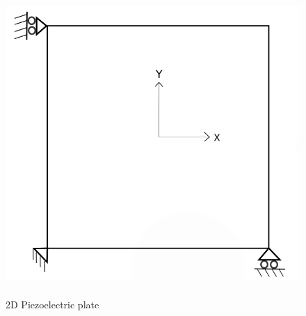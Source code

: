 \documentclass[12pt]{article}
\begin{document}
\begin{figure}[H]
	\begin{center}
	\includegraphics[scale=0.3]{2DPlate.png} 
	\caption{\\2D Piezoelectric plate}\label{2Dplate}
	\end{center}	
\end{figure}
\end{document}

